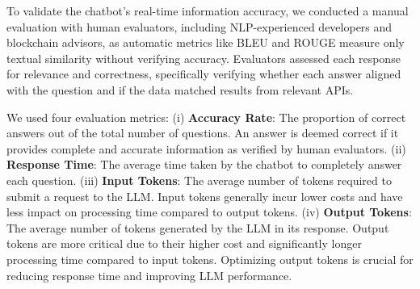 \documentclass[runningheads]{llncs}
\begin{document}

To validate the chatbot’s real-time information accuracy, we conducted a manual evaluation with human evaluators, including NLP-experienced developers and blockchain advisors, as automatic metrics like BLEU and ROUGE measure only textual similarity without verifying accuracy. Evaluators assessed each response for relevance and correctness, specifically verifying whether each answer aligned with the question and if the data matched results from relevant APIs.



We used four evaluation metrics: (i) \textbf{Accuracy Rate}: The proportion of correct answers out of the total number of questions. An answer is deemed correct if it provides complete and accurate information as verified by human evaluators. (ii) \textbf{Response Time}: The average time taken by the chatbot to completely answer each question. (iii) \textbf{Input Tokens}: The average number of tokens required to submit a request to the LLM. Input tokens generally incur lower costs and have less impact on processing time compared to output tokens. (iv) \textbf{Output Tokens}: The average number of tokens generated by the LLM in its response. Output tokens are more critical due to their higher cost and significantly longer processing time compared to input tokens. Optimizing output tokens is crucial for reducing response time and improving LLM performance.
\end{document}
